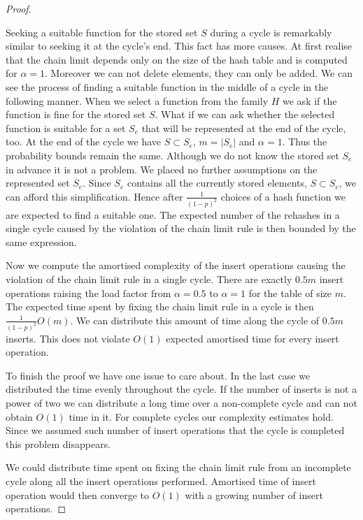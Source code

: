 \begin{proof}
\begin{itemize}
Seeking a suitable function for the stored set $S$ during a cycle is remarkably similar to seeking it at the cycle's end. This fact has more causes. At first realise that the chain limit depends only on the size of the hash table and is computed for $\alpha = 1$. Moreover we can not delete elements, they can only be added. We can see the process of finding a suitable function in the middle of a cycle in the following manner. When we select a function from the family $H$ we ask if the function is fine for the stored set $S$. What if we can ask whether the selected function is suitable for a set $S_e$ that will be represented at the end of the cycle, too. At the end of the cycle we have $S \subset S_e$, $m = |S_e|$ and $\alpha = 1$. Thus the probability bounds remain the same. Although we do not know the stored set $S_e$ in advance it is not a problem. We placed no further assumptions on the represented set $S_e$. Since $S_e$ contains all the currently stored elements, $S \subset S_e$, we can afford this simplification. Hence after $\frac{1}{(1-p)^2}$ choices of a hash function we are expected to find a suitable one. The expected number of the rehashes in a single cycle caused by the violation of the chain limit rule is then bounded by the same expression. 

Now we compute the amortised complexity of the insert operations causing the violation of the chain limit rule in a single cycle. There are exactly $0.5 m$ insert operations raising the load factor from $\alpha = 0.5$ to $\alpha = 1$ for the table of size $m$. The expected time spent by fixing the chain limit rule in a cycle is then $\frac{1}{(1 - p)^2}O(m)$. We can distribute this amount of time along the cycle of $0.5 m$ inserts. This does not violate $O(1)$ expected amortised time for every insert operation.
\end{itemize}

To finish the proof we have one issue to care about. In the last case we distributed the time evenly throughout the cycle. If the number of inserts is not a power of two we can distribute a long time over a non-complete cycle and can not obtain $O(1)$ time in it. For complete cycles our complexity estimates hold. Since we assumed such number of insert operations that the cycle is completed this problem disappears.

We could distribute time spent on fixing the chain limit rule from an incomplete cycle along all the insert operations performed. Amortised time of insert operation would then converge to $O(1)$ with a growing number of insert operations.
\end{proof}

